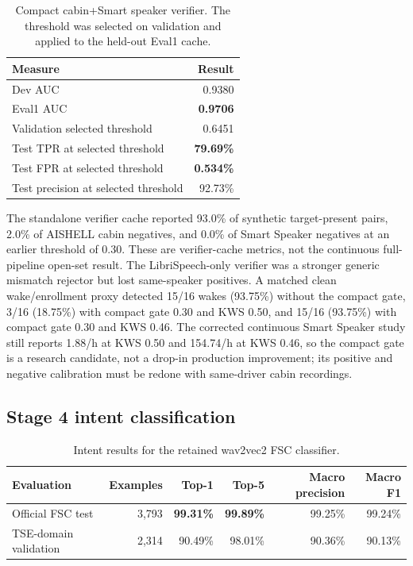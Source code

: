 \documentclass[11pt,a4paper]{article}
\begin{document}
\begin{table}[H]
\centering
\caption{Compact cabin+Smart speaker verifier. The threshold was selected on
validation and applied to the held-out Eval1 cache.}
\label{tab:verifier}
\small
\begin{tabular}{@{}lr@{}}
\toprule
\textbf{Measure} & \textbf{Result}\\
\midrule
Dev AUC & 0.9380\\
Eval1 AUC & \textbf{0.9706}\\
Validation selected threshold & 0.6451\\
Test TPR at selected threshold & \textbf{79.69\%}\\
Test FPR at selected threshold & \textbf{0.534\%}\\
Test precision at selected threshold & 92.73\%\\
\bottomrule
\end{tabular}
\end{table}

The standalone verifier cache reported 93.0\% of synthetic target-present
pairs, 2.0\% of AISHELL cabin negatives, and 0.0\% of Smart Speaker negatives
at an earlier threshold of 0.30. These are verifier-cache metrics, not the
continuous full-pipeline open-set result. The LibriSpeech-only verifier was a
stronger generic mismatch rejector but lost same-speaker positives. A matched
clean wake/enrollment proxy detected 15/16 wakes (93.75\%) without the compact
gate, 3/16 (18.75\%) with compact gate 0.30 and KWS 0.50, and 15/16 (93.75\%)
with compact gate 0.30 and KWS 0.46. The corrected continuous Smart Speaker
study still reports 1.88/h at KWS 0.50 and 154.74/h at KWS 0.46, so the
compact gate is a research candidate, not a drop-in production improvement;
its positive and negative calibration must be redone with same-driver cabin
recordings.

\subsection{Stage 4 intent classification}

\begin{table}[H]
\centering
\caption{Intent results for the retained wav2vec2 FSC classifier.}
\label{tab:intent}
\small
\begin{tabular}{@{}lrrrrr@{}}
\toprule
\textbf{Evaluation} & \textbf{Examples} & \textbf{Top-1} & \textbf{Top-5} & \textbf{Macro precision} & \textbf{Macro F1}\\
\midrule
Official FSC test & 3,793 & \textbf{99.31\%} & \textbf{99.89\%} & 99.25\% & 99.24\%\\
TSE-domain validation & 2,314 & 90.49\% & 98.01\% & 90.36\% & 90.13\%\\
\bottomrule
\end{tabular}
\end{table}
\end{document}
